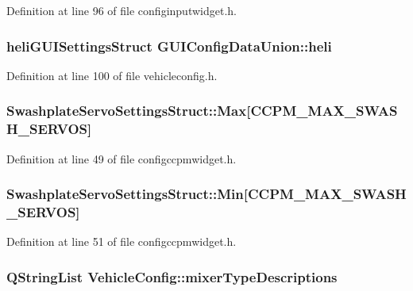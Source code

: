 Definition at line 96 of file configinputwidget.\-h.

\hypertarget{group___config_plugin_gae9da8787d8f36ea6650045cf28c3b40d}{
\subsubsection[{heli}]{\setlength{\rightskip}{0pt plus 5cm}heli\-G\-U\-I\-Settings\-Struct G\-U\-I\-Config\-Data\-Union\-::heli}}\label{group___config_plugin_gae9da8787d8f36ea6650045cf28c3b40d}


Definition at line 100 of file vehicleconfig.\-h.

\hypertarget{group___config_plugin_ga30259c7dfef707f2d0999fed8adaf6b1}{
\subsubsection[{Max}]{ Swashplate\-Servo\-Settings\-Struct\-::\-Max\mbox{[}C\-C\-P\-M\-\_\-\-M\-A\-X\-\_\-\-S\-W\-A\-S\-H\-\_\-\-S\-E\-R\-V\-O\-S\mbox{]}}}\label{group___config_plugin_ga30259c7dfef707f2d0999fed8adaf6b1}


Definition at line 49 of file configccpmwidget.\-h.

\hypertarget{group___config_plugin_ga68b64812e9062f2c280eebb8ad8961c4}{
\subsubsection[{Min}]{ Swashplate\-Servo\-Settings\-Struct\-::\-Min\mbox{[}C\-C\-P\-M\-\_\-\-M\-A\-X\-\_\-\-S\-W\-A\-S\-H\-\_\-\-S\-E\-R\-V\-O\-S\mbox{]}}}\label{group___config_plugin_ga68b64812e9062f2c280eebb8ad8961c4}


Definition at line 51 of file configccpmwidget.\-h.

\hypertarget{group___config_plugin_ga05f4cbfd3c5b0fcc642f17003888459a}{
\subsubsection[{mixer\-Type\-Descriptions}]{\setlength{\rightskip}{0pt plus 5cm}Q\-String\-List Vehicle\-Config\-::mixer\-Type\-Descriptions}}\label{group___config_plugin_ga05f4cbfd3c5b0fcc642f17003888459a}


